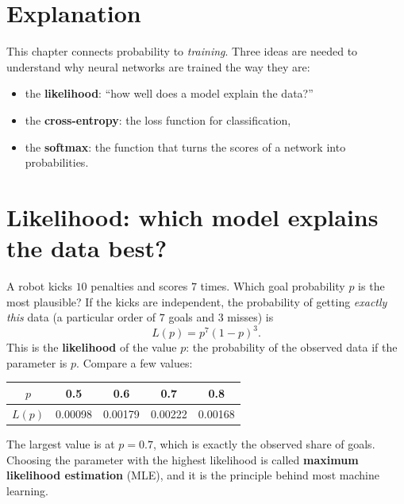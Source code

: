 \label{ch:xent}

\section*{Explanation}
This chapter connects probability to \emph{training}. Three ideas are needed to understand why neural networks are trained the way they are:
\begin{itemize}[nosep]
  \item the \textbf{likelihood}: ``how well does a model explain the data?''
  \item the \textbf{cross-entropy}: the loss function for classification,
  \item the \textbf{softmax}: the function that turns the scores of a network into probabilities.
\end{itemize}

\section*{Likelihood: which model explains the data best?}
A robot kicks $10$ penalties and scores $7$ times. Which goal probability $p$ is the most plausible? If the kicks are independent, the probability of getting \emph{exactly this} data (a particular order of $7$ goals and $3$ misses) is
\[
L(p)=p^7(1-p)^3.
\]
This is the \textbf{likelihood} of the value $p$: the probability of the observed data if the parameter is $p$. Compare a few values:
\begin{center}
\renewcommand{\arraystretch}{1.15}
\begin{tabular}{c|cccc}
$p$ & 0.5 & 0.6 & 0.7 & 0.8\\ \hline
$L(p)$ & 0.00098 & 0.00179 & 0.00222 & 0.00168
\end{tabular}
\end{center}
The largest value is at $p=0.7$, which is exactly the observed share of goals. Choosing the parameter with the highest likelihood is called \textbf{maximum likelihood estimation} (MLE), and it is the principle behind most machine learning.

\begin{center}
\label{fig:pr6_like}
\end{center}


